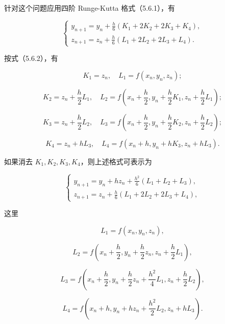 \documentclass[
  10pt,
  fontset=fandol]{ctexart}
\begin{document}
针对这个问题应用四阶 Runge-Kutta 格式（5.6.1），有

\[
\begin{cases}
\displaystyle y_{n+1}=y_n+\frac h6(K_1+2K_2+2K_3+K_4),\\[6pt]
\displaystyle z_{n+1}=z_n+\frac h6(L_1+2L_2+2L_3+L_4).
\end{cases}
\]

按式（5.6.2），有

\[
K_1=z_n,\quad L_1=f(x_n,y_n,z_n);
\]

\[
K_2=z_n+\frac h2L_1,\quad
L_2=f\left(x_n+\frac h2,y_n+\frac h2K_1,z_n+\frac h2L_1\right);
\]

\[
K_3=z_n+\frac h2L_2,\quad
L_3=f\left(x_n+\frac h2,y_n+\frac h2K_2,z_n+\frac h2L_2\right);
\]

\[
K_4=z_n+hL_3,\quad L_4=f(x_n+h,y_n+hK_3,z_n+hL_3).
\]

如果消去 \(K_1,K_2,K_3,K_4\)，则上述格式可表示为

\[
\begin{cases}
\displaystyle y_{n+1}=y_n+hz_n+\frac{h^2}{6}(L_1+L_2+L_3),\\[6pt]
\displaystyle z_{n+1}=z_n+\frac h6(L_1+2L_2+2L_3+L_4),
\end{cases}
\]

这里

\[
L_1=f(x_n,y_n,z_n),
\]

\[
L_2=f\left(x_n+\frac h2,y_n+\frac h2z_n,z_n+\frac h2L_1\right),
\]

\[
L_3=f\left(x_n+\frac h2,y_n+\frac h2z_n+\frac{h^2}{4}L_1,z_n+\frac h2L_2\right),
\]

\[
L_4=f\left(x_n+h,y_n+hz_n+\frac{h^2}{2}L_2,z_n+hL_3\right).
\]
\end{document}

